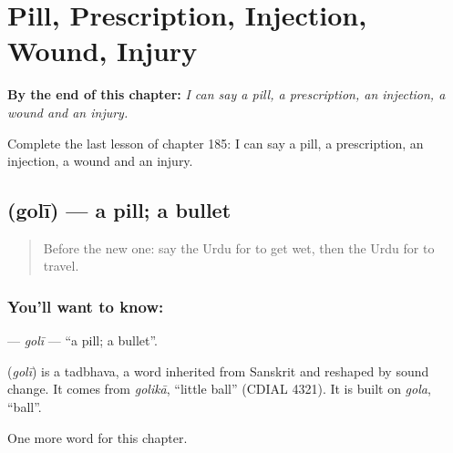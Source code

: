 
\chapter{Pill, Prescription, Injection, Wound, Injury}
\label{ch:ur-pill-prescription-injection-wound-injury}

\begin{chapteropening}
\textbf{By the end of this chapter:} \emph{I can say a pill, a prescription, an injection, a wound and an injury.}

Complete the last lesson of chapter 185: I can say a pill, a prescription, an injection, a wound and an injury.
\end{chapteropening}

\section[\texorpdfstring{\ur{گولی} (golī)}{گولی (golī)}]{ (golī) — a pill; a bullet}

\label{lesson:UR-C185-goli}



\begin{quote}
Before the new one: say the Urdu for to get wet, then the Urdu for to travel.
\end{quote}

\subsection*{You'll want to know: }
\textbf{} — \emph{golī} — \textquotedblleft{}a pill; a bullet\textquotedblright{}.

\begin{cousinweb}
\textbf{} (\emph{golī}) is a tadbhava, a word inherited from Sanskrit and reshaped by sound change. It comes from \emph{golikā}, \textquotedblleft{}little ball\textquotedblright{} (CDIAL 4321). It is built on \emph{gola}, \textquotedblleft{}ball\textquotedblright{}.
\end{cousinweb}

\begin{grammarlens}[title={What you've built}]
One more word for this chapter.
\end{grammarlens}

